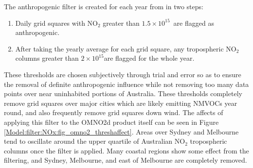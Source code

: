     {\label{Model:filter:NOx:fig_omno2_timeseries}}
    
    The anthropogenic filter is created for each year from in two steps:
    \begin{enumerate}
      \item Daily grid squares with NO$_2$ greater than $1.5\times10^{15}$\moleccm  ~are flagged as anthropogenic.
      \item After taking the yearly average for each grid square, any tropospheric NO$_2$ columns greater than $2 \times 10^{15}$\moleccm are flagged for the whole year.
    \end{enumerate}
    These thresholds are chosen subjectively through trial and error so as to ensure the removal of definite anthropogenic influence while not removing too many data points over near uninhabited portions of Australia.
    These thresholds completely remove grid squares over major cities which are likely emitting NMVOCs year round, and also frequently remove grid squares down wind.
    The affects of applying this filter to the OMNO2d product itself can be seen in Figure \ref{Model:filter:NOx:fig_omno2_threshaffect}.
    Areas over Sydney and Melbourne tend to oscillate around the upper quartile of Australian NO$_2$ tropospheric columns once the filter is applied.
    Many coastal regions show some effect from the filtering, and Sydney, Melbourne, and east of Melbourne are completely removed.
    
    {\label{Model:filter:NOx:fig_omno2_threshaffect}}
    
